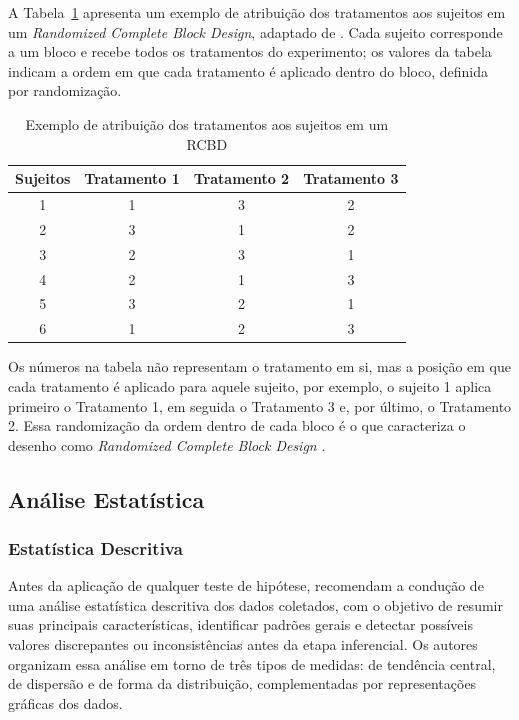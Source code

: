 A Tabela~\ref{tab:exemplo_rcbd} apresenta um exemplo de atribuição dos
tratamentos aos sujeitos em um \textit{Randomized Complete Block Design},
adaptado de . Cada sujeito corresponde a um
bloco e recebe todos os tratamentos do experimento; os valores da tabela
indicam a ordem em que cada tratamento é aplicado dentro do bloco, definida
por randomização.
 
\begin{table}[H]
\centering
\caption{Exemplo de atribuição dos tratamentos aos sujeitos em um RCBD}
\label{tab:exemplo_rcbd}
\begin{tabular}{|c|c|c|c|}
\hline
\textbf{Sujeitos} & \textbf{Tratamento 1} & \textbf{Tratamento 2} & \textbf{Tratamento 3} \\
\hline
1 & 1 & 3 & 2 \\
\hline
2 & 3 & 1 & 2 \\
\hline
3 & 2 & 3 & 1 \\
\hline
4 & 2 & 1 & 3 \\
\hline
5 & 3 & 2 & 1 \\
\hline
6 & 1 & 2 & 3 \\
\hline
\end{tabular}
\end{table}
 
Os números na tabela não representam o tratamento em si, mas a posição em
que cada tratamento é aplicado para aquele sujeito, por exemplo, o
sujeito 1 aplica primeiro o Tratamento 1, em seguida o Tratamento 3 e, por
último, o Tratamento 2. Essa randomização da ordem dentro de cada bloco é o que caracteriza o desenho como \textit{Randomized Complete Block Design} \cite{wohlin2024}.

\subsection{Análise Estatística}

\subsubsection{Estatística Descritiva}

Antes da aplicação de qualquer teste de hipótese,  recomendam a condução de uma análise estatística descritiva dos dados coletados, com o objetivo de resumir suas principais características, identificar padrões gerais e detectar possíveis valores discrepantes ou inconsistências antes da etapa inferencial. Os autores organizam essa análise em torno de três tipos de medidas: de tendência central, de dispersão e de forma da distribuição, complementadas por representações gráficas dos dados.

